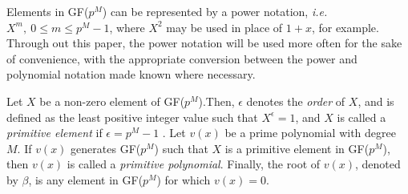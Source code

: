 Elements in GF($p^M$) can be represented by a power notation, \textit{i.e.} $X^m,~0 \leq m \leq p^M-1$, where $X^2$ may be used in place of $1+x$, for example. Through out this paper, the power notation will be used more often for the sake of convenience, with the appropriate conversion between the power and polynomial notation made known where necessary.  

Let $X$ be a non-zero element of GF($p^M$).Then, $\epsilon$ denotes the \textit{order} of $X$, and is defined as the least positive integer value such that $X^{\epsilon}=1$, and $X$ is called a \textit{primitive element} if $\epsilon=p^M-1$ . Let $v(x)$ be a prime polynomial with degree $M$. If $v(x)$ generates GF($p^M$) such that $X$ is a primitive element in GF($p^M$), then  $v(x)$ is called a \textit{primitive polynomial}. Finally, the root of $v(x)$, denoted by $\beta$, is any element in GF($p^M$) for which $v(x)=0$.


 







